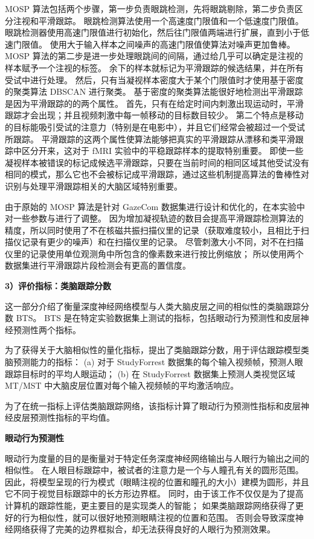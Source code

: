 \documentclass[a4paper,zihao=-4]{article}
\begin{document}
MOSP 算法包括两个步骤，第一步负责眼跳检测，先将眼跳剔除，第二步负责区分注视和平滑跟踪。
眼跳检测算法使用一个高速度门限值和一个低速度门限值。
眼跳检测器使用高速门限值进行初始化，然后往门限值两端进行扩展，直到小于低速门限值。
使用大于输入样本之间噪声的高速门限值使算法对噪声更加鲁棒。
MOSP 算法的第二步是进一步处理眼跳间的间隔，通过给几乎可以确定是注视的样本赋予一个注视的标签。
余下的样本就标记为平滑跟踪的候选结果，并在所有受试中进行处理。
然后，只有当凝视样本密度大于某个门限值时才使用基于密度的聚类算法 DBSCAN 进行聚类。
基于密度的聚类算法能很好地检测出平滑跟踪是因为平滑跟踪的的两个属性。
% 
首先，只有在给定时间内刺激出现运动时，平滑跟踪才会出现；并且视频刺激中每一帧移动的目标数目较少。
%
第二个特点是移动的目标能吸引受试的注意力（特别是在电影中），并且它们经常会被超过一个受试所跟踪。
平滑跟踪的这两个属性使算法能够把真实的平滑跟踪从漂移和类平滑跟踪中区分开来，这对于 fMRI 实验中的平稳跟踪样本的提取特别重要。
即使一些凝视样本被错误的标记成候选平滑跟踪，只要在当前时间的相同区域其他受试没有相同的模式，那么它也不会被标记成平滑跟踪，通过这些机制提高算法的鲁棒性对识别与处理平滑跟踪相关的大脑区域特别重要。

由于原始的 MOSP 算法是针对 GazeCom 数据集进行设计和优化的，在本实验中对一些参数与进行了调整。
因为增加凝视轨迹的数目会提高平滑跟踪检测算法的精度，所以同时使用了不在核磁共振扫描仪里的记录（获取难度较小，且相比于扫描仪记录有更少的噪声）和在扫描仪里的记录。
尽管刺激大小不同，对不在扫描仪里的记录使用单位观测角中所包含的像素数来进行按比例缩放；
所以使用两个数据集进行平滑跟踪片段检测会有更高的置信度。


\textbf{3）评价指标：类脑跟踪分数}

这一部分介绍了衡量深度神经网络模型与人类大脑皮层之间的相似性的类脑跟踪分数 BTS。
BTS 是在特定实验数据集上测试的指标，包括眼动行为预测性和皮层神经预测性两个指标。

为了获得关于大脑相似性的量化指标，提出了类脑跟踪分数，用于评估跟踪模型类脑预测能力的指标：
(a) 对于 StudyForrest 数据集的每个输入视频帧，预测人眼跟踪目标时的平均人眼运动；
(b) 在 StudyForrest 数据集上预测人类视觉区域 MT/MST 中大脑皮层位置对每个输入视频帧的平均激活响应。

为了在统一指标上评估类脑跟踪网络，该指标计算了眼动行为预测性指标和皮层神经皮层预测性指标的平均值。

\textbf{眼动行为预测性}

眼动行为度量的目的是衡量对于特定任务深度神经网络输出与人眼行为输出之间的相似性。
在人眼目标跟踪中，被试者的注意力是一个与人瞳孔有关的圆形范围。
因此，将模型呈现的行为模式（眼睛注视的位置和瞳孔的大小）建模为圆形，并且它不同于视觉目标跟踪中的长方形边界框。
同时，由于该工作不仅仅是为了提高计算机的跟踪性能，更主要目的是实现类人的智能；
如果类脑跟踪网络获得了更好的行为相似性，就可以很好地预测眼睛注视的位置和范围。
否则会导致深度神经网络获得了完美的边界框拟合，却无法获得良好的人眼行为预测效果。
\end{document}
